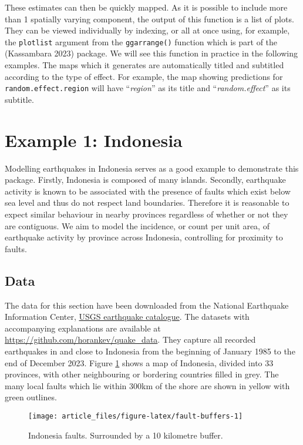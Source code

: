 These estimates can then be quickly mapped. As it is possible to include more than 1 spatially varying component, the output of this function is a list of plots. They can be viewed individually by indexing, or all at once using, for example, the \texttt{plotlist} argument from the \texttt{ggarrange()} function which is part of the  (Kassambara 2023) package. We will see this function in practice in the following examples. The maps which it generates are automatically titled and subtitled according to the type of effect. For example, the map showing predictions for \texttt{random.effect.region} will have ``\emph{region}'' as its title and ``\emph{random.effect}'' as its subtitle.

\hypertarget{example-1-indonesia}{%
\section{Example 1: Indonesia}\label{example-1-indonesia}}

Modelling earthquakes in Indonesia serves as a good example to
demonstrate this package. Firstly, Indonesia is composed of many
islands. Secondly, earthquake activity is known to be associated with
the presence of faults which exist below sea level and thus do not
respect land boundaries. Therefore it is reasonable to expect similar
behaviour in nearby provinces regardless of whether or not they are
contiguous. We aim to model the incidence, or count per unit area, of earthquake activity by
province across Indonesia, controlling for proximity to faults.

\hypertarget{data}{%
\subsection{Data}\label{data}}

The data for this section have been downloaded from the National Earthquake Information Center, \href{https://earthquake.usgs.gov/earthquakes/search/}{USGS earthquake
catalogue}. The
datasets with accompanying explanations are available at
\url{https://github.com/horankev/quake_data}. They capture all recorded earthquakes in
and close to Indonesia from the beginning of January 1985 to the end of December 2023. Figure \ref{fig:fault-buffers} shows a map of Indonesia, divided into 33 provinces, with other neighbouring or bordering countries filled in grey. The many local
faults which lie within 300km of the shore are shown in yellow with green outlines.

\begin{figure}

{\centering \texttt{[image: article\_files/figure-latex/fault-buffers-1]} 

}

\caption{Indonesia faults. Surrounded by a 10 kilometre buffer. }\label{fig:fault-buffers}
\end{figure}

